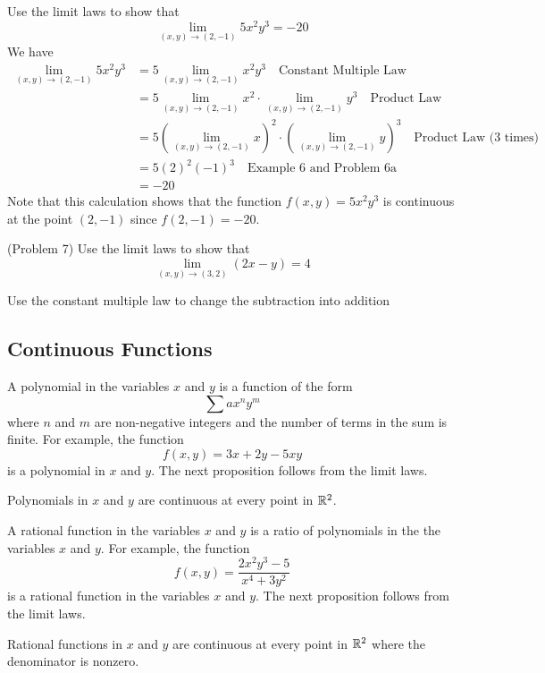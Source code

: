 \documentclass[handout]{ximera}
\begin{document}
\begin{example}[Example 7]
Use the limit laws to show that 
\[
\lim_{(x,y) \to (2,-1)} 5x^2y^3 = -20
\]
We have
\begin{align*}
\lim_{(x,y) \to (2,-1)} 5x^2y^3 &= 5\lim_{(x,y) \to (2,-1)} x^2y^3 \quad \text{Constant Multiple Law}\\
  &= 5 \lim_{(x,y) \to (2,-1)} x^2 \cdot \lim_{(x,y) \to (2,-1)}y^3  \quad \text{Product Law}\\
  &= 5 \left(\lim_{(x,y) \to (2,-1)} x\right)^2 \cdot \left(\lim_{(x,y) \to (2,-1)}y\right)^3  \quad \text{Product Law (3 times)}\\
  &= 5(2)^2(-1)^3 \quad \text{Example 6 and Problem 6a}\\
  &= -20
\end{align*}
Note that this calculation shows that the function $f(x,y) = 5x^2y^3$ is continuous at the point $(2, -1)$ since $f(2, -1) = -20$.
\end{example}


\begin{problem}(Problem 7)
Use the limit laws to show that 
\[
\lim_{(x,y) \to (3,2)} (2x - y) = 4
\]
\begin{hint}
Use the constant multiple law to change the subtraction into addition
\end{hint}
\end{problem}

\subsection{Continuous Functions}
A polynomial in the variables $x$ and $y$ is a function of the form
\[
\sum ax^ny^m
\]
where $n$ and $m$ are non-negative integers and the number of terms in the sum is finite.
For example, the function
\[
f(x,y) = 3x + 2y - 5xy
\]
is a polynomial in $x$ and $y$. The next proposition follows from the limit laws.

\begin{proposition}
Polynomials in $x$ and $y$ are continuous at every point in $\mathbb R^2$.
\end{proposition}

A rational function in the variables $x$ and $y$ is a ratio of polynomials in the the variables $x$ and $y$.
For example, the function
\[
f(x,y) = \frac{2x^2y^3 - 5}{x^4 + 3y^2}
\]
is a rational function in the variables $x$ and $y$.
The next proposition follows from the limit laws.

\begin{proposition}
Rational functions in $x$ and $y$ are continuous at every point in $\mathbb R^2$ where the denominator is nonzero.
\end{proposition}
\end{document}
